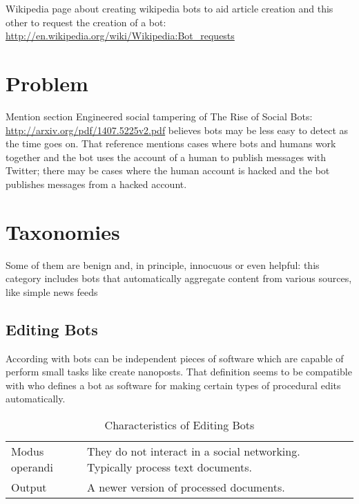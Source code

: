 \documentclass[twoside]{article}
\begin{document}
\begin{multicols}{2}
Wikipedia page about creating wikipedia bots to aid article creation\cite{wtalk:2014} and this other to request the creation of a bot: \url{http://en.wikipedia.org/wiki/Wikipedia:Bot_requests}



\section{Problem}
Mention section Engineered social tampering of The Rise of Social Bots: \url{http://arxiv.org/pdf/1407.5225v2.pdf}
\cite{emerging:2014} believes bots may be less easy to detect as the time goes on. That reference mentions cases where bots and humans work together and the bot uses the account of a human to publish messages with Twitter; there may be cases where the human account is hacked and the bot publishes messages from a hacked account.

\section{Taxonomies}
Some of them are benign and, in principle, innocuous
or even helpful: this category includes bots that automatically aggregate content
from various sources, like simple news feeds\cite{ferrara:2015}
    
\subsection{Editing Bots}
    According with \cite{kuhn:2015} bots can be independent pieces of software which are capable of perform small tasks like create 
    nanoposts. That definition seems to be compatible with \cite{ayers:2008} who defines a bot as software for making certain types 
    of procedural edits automatically.
    
    \begin{table}[H]
        \caption{Characteristics of Editing Bots}
        \begin{tabular}{p{2cm} p{4cm}}
        \toprule
        Modus operandi &  They do not interact in a social networking. Typically process text documents. \\ 
        Output                &  A newer version of processed documents. \\
        \bottomrule
        \end{tabular}
        \label{tab:editingb}
    \end{table}
    

\end{multicols}
\end{document}
